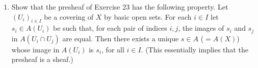 \begin{enumerate}
The assignment of the ring $A(U)$ to each basic open set $U$ of $X$, and the restriction homomorphisms $\rho$, satisfying the conditions iii) and iv) above, constitutes a \textit{presheaf of rings} on the basis of open sets $(X_f)_{f\in A}$. v) says that the stalk of this presheaf at $x\in X$ is the corresponding local ring $A_{\mathfrak p}$.

\item Show that the presheaf of Exercise 23 has the following property. Let $(U_i)_{i\in I}$ be a covering of $X$ by basic open sets. For each $i\in I$ let $s_i\in A(U_i)$ be such that, for each pair of indices $i,j$, the images of $s_i$ and $s_j$ in $A(U_i\cap U_j)$ are equal. Then there exists a unique $s\in A$ ($=A(X)$) whose image in $A(U_i)$ is $s_i$, for all $i\in I$. (This essentially implies that the presheaf is a sheaf.)
\end{enumerate}

